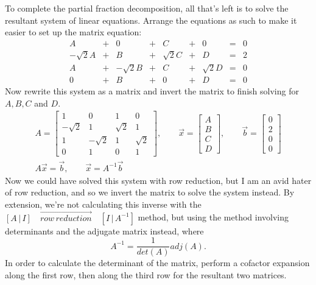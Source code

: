 \documentclass{article}
\theoremstyle{definition}
\begin{document}
To complete the partial fraction decomposition, all that's left is to solve the resultant system
of linear equations. Arrange the equations as such to make it easier to set up the matrix equation:
\begin{equation*}
\begin{array}{lclclclcl}
    A & + & 0 & + & C & + & 0 & = & 0\\
    -\sqrt{2}A & + & B & + & \sqrt{2}C & + & D & = & 2\\
    A & + & -\sqrt{2}B & + & C & + & \sqrt{2}D & = & 0\\
    0 & + & B & + & 0 & + & D & = & 0  
\end{array}
\end{equation*}
Now rewrite this system as a matrix and invert the matrix to finish solving for $A, B, C$ and $D$.
\[
\begin{gathered}
A = \begin{bmatrix}
    1 & 0 & 1 & 0\\
    -\sqrt{2} & 1 & \sqrt{2} & 1\\
    1 & -\sqrt{2} & 1 & \sqrt{2}\\
    0 & 1 & 0 & 1
\end{bmatrix}, \qquad
\vec{x} = \begin{bmatrix}
    A\\
    B\\
    C\\
    D
\end{bmatrix}, \qquad
\vec{b} = \begin{bmatrix}
    0\\
    2\\
    0\\
    0
\end{bmatrix}\\
A\vec{x} = \vec{b}, \qquad \vec{x} = A^{-1}\vec{b}
\end{gathered}
\]
Now we could have solved this system with row reduction, but I am an avid hater of row reduction,
and so we invert the matrix to solve the system instead. By extension, we're not calculating this
inverse with the $[A\,|\,I]\quad \overrightarrow{row\,reduction} \quad[I\,|\,A^{-1}]$ method, but
using the method involving determinants and the adjugate matrix instead, where
\begin{equation*}
    A^{-1} = \frac{1}{det(A)}adj(A).
\end{equation*}
In order to calculate the determinant of the matrix, perform a cofactor expansion along the first 
row, then along the third row for the resultant two matrices. 
\end{document}
